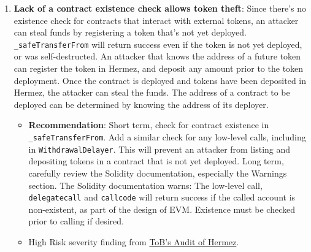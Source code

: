 \begin{enumerate}
\item\textbf{Lack of a contract existence check allows token theft}: Since there’s no existence check for contracts that interact with external tokens, an attacker can steal funds by registering a token that’s not yet deployed. \verb|_safeTransferFrom| will return success even if the token is not yet deployed, or was self-destructed. An attacker that knows the address of a future token can register the token in Hermez, and deposit any amount prior to the token deployment. Once the contract is deployed and tokens have been deposited in Hermez, the attacker can steal the funds. The address of a contract to be deployed can be determined by knowing the address of its deployer.
	\begin{itemize}
	\item\textbf{Recommendation}: Short term, check for contract existence in \verb|_safeTransferFrom|. Add a similar check for any low-level calls, including in \verb|WithdrawalDelayer|. This will prevent an attacker from listing and depositing tokens in a contract that is not yet deployed. Long term, carefully review the Solidity documentation, especially the Warnings section. The Solidity documentation warns: The low-level call, \verb|delegatecall| and \verb|callcode| will return success if the called account is non-existent, as part of the design of EVM. Existence must be checked prior to calling if desired.
	\item High Risk severity finding from \href{https://github.com/trailofbits/publications/blob/master/reviews/hermez.pdf}{ToB’s Audit of Hermez}.
	\end{itemize}


\end{enumerate}
